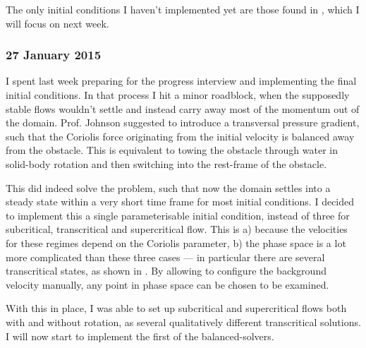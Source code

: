 \documentclass[a4paper,onecolumn,11pt]{report}
\begin{document}
The only initial conditions I haven't implemented yet are those found in \citet{esler2005steady}, which I will focus on next week.

\subsubsection*{27 January 2015}

I spent last week preparing for the progress interview and implementing the final initial conditions. In that process I hit a minor roadblock, when the supposedly stable flows wouldn't settle and instead carry away most of the momentum out of the domain. Prof. Johnson suggested to introduce a transversal pressure gradient, such that the Coriolis force originating from the initial velocity is balanced away from the obstacle. This is equivalent to towing the obstacle through water in solid-body rotation and then switching into the rest-frame of the obstacle.

This did indeed solve the problem, such that now the domain settles into a steady state within a very short time frame for most initial conditions. I decided to implement this a single parameterisable initial condition, instead of three for subcritical, transcritical and supercritical flow. This is a) because the velocities for these regimes depend on the Coriolis parameter, b) the phase space is a lot more complicated than these three cases --- in particular there are several transcritical states, as shown in \citet{esler2005steady}. By allowing to configure the background velocity manually, any point in phase space can be chosen to be examined.

With this in place, I was able to set up subcritical and supercritical flows both with and without rotation, as several qualitatively different transcritical solutions. I will now start to implement the first of the balanced-solvers.



\end{document}

